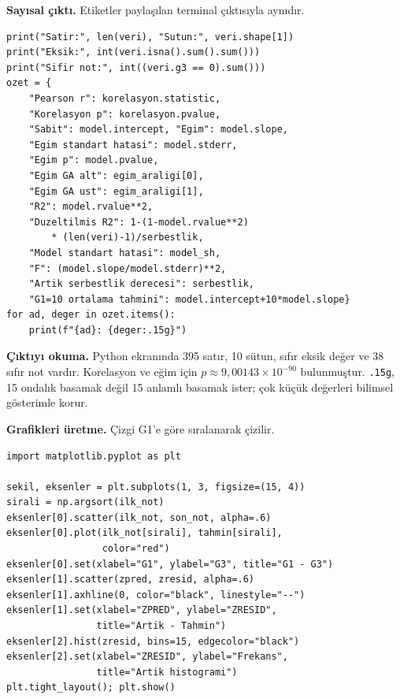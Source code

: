 \par\noindent\begin{minipage}{\linewidth}
\textbf{Sayısal çıktı.} Etiketler paylaşılan terminal çıktısıyla aynıdır.

\begin{lstlisting}[style=prismPythonApp]
print("Satir:", len(veri), "Sutun:", veri.shape[1])
print("Eksik:", int(veri.isna().sum().sum()))
print("Sifir not:", int((veri.g3 == 0).sum()))
ozet = {
    "Pearson r": korelasyon.statistic,
    "Korelasyon p": korelasyon.pvalue,
    "Sabit": model.intercept, "Egim": model.slope,
    "Egim standart hatasi": model.stderr,
    "Egim p": model.pvalue,
    "Egim GA alt": egim_araligi[0],
    "Egim GA ust": egim_araligi[1],
    "R2": model.rvalue**2,
    "Duzeltilmis R2": 1-(1-model.rvalue**2)
        * (len(veri)-1)/serbestlik,
    "Model standart hatasi": model_sh,
    "F": (model.slope/model.stderr)**2,
    "Artik serbestlik derecesi": serbestlik,
    "G1=10 ortalama tahmini": model.intercept+10*model.slope}
for ad, deger in ozet.items():
    print(f"{ad}: {deger:.15g}")
\end{lstlisting}

\textbf{Çıktıyı okuma.} Python ekranında 395 satır, 10 sütun,
sıfır eksik değer ve 38 sıfır not vardır. Korelasyon ve eğim için
$p\approx9{,}00143\times10^{-90}$ bulunmuştur. \texttt{.15g},
15 ondalık basamak değil 15 anlamlı basamak ister; çok küçük
değerleri bilimsel gösterimle korur.
\end{minipage}\par

\par\noindent\begin{minipage}{\linewidth}
\textbf{Grafikleri üretme.} Çizgi G1'e göre sıralanarak çizilir.

\begin{lstlisting}[style=prismPythonApp]
import matplotlib.pyplot as plt

sekil, eksenler = plt.subplots(1, 3, figsize=(15, 4))
sirali = np.argsort(ilk_not)
eksenler[0].scatter(ilk_not, son_not, alpha=.6)
eksenler[0].plot(ilk_not[sirali], tahmin[sirali],
                 color="red")
eksenler[0].set(xlabel="G1", ylabel="G3", title="G1 - G3")
eksenler[1].scatter(zpred, zresid, alpha=.6)
eksenler[1].axhline(0, color="black", linestyle="--")
eksenler[1].set(xlabel="ZPRED", ylabel="ZRESID",
                title="Artik - Tahmin")
eksenler[2].hist(zresid, bins=15, edgecolor="black")
eksenler[2].set(xlabel="ZRESID", ylabel="Frekans",
                title="Artik histogrami")
plt.tight_layout(); plt.show()
\end{lstlisting}
\end{minipage}\par

